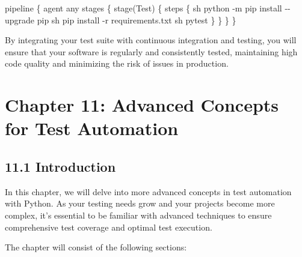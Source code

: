 \documentclass[
  paper=a4,
  ,captions=tableheading
]{scrartcl}
\newenvironment{Shaded}{}{}
\newcommand{\FunctionTok}[1]{\textcolor[rgb]{0.02,0.16,0.49}{#1}}
\newcommand{\NormalTok}[1]{#1}
\newcommand{\OperatorTok}[1]{\textcolor[rgb]{0.40,0.40,0.40}{#1}}
\newcommand{\StringTok}[1]{\textcolor[rgb]{0.25,0.44,0.63}{#1}}
\begin{document}
\begin{enumerate}
\begin{itemize}
\begin{Shaded}
\begin{Highlighting}[]
\NormalTok{pipeline }\OperatorTok{\{}
\NormalTok{    agent any}
\NormalTok{    stages }\OperatorTok{\{}
        \FunctionTok{stage}\OperatorTok{(}\StringTok{\textquotesingle{}Test\textquotesingle{}}\OperatorTok{)} \OperatorTok{\{}
\NormalTok{            steps }\OperatorTok{\{}
\NormalTok{                sh }\StringTok{\textquotesingle{}python {-}m pip install {-}{-}upgrade pip\textquotesingle{}}
\NormalTok{                sh }\StringTok{\textquotesingle{}pip install {-}r requirements.txt\textquotesingle{}}
\NormalTok{                sh }\StringTok{\textquotesingle{}pytest\textquotesingle{}}
            \OperatorTok{\}}
        \OperatorTok{\}}
    \OperatorTok{\}}
\OperatorTok{\}}
\end{Highlighting}
\end{Shaded}
  \end{itemize}
\end{enumerate}

By integrating your test suite with continuous integration and testing,
you will ensure that your software is regularly and consistently tested,
maintaining high code quality and minimizing the risk of issues in
production.

\hypertarget{chapter-11-advanced-concepts-for-test-automation}{%
\chapter{Chapter 11: Advanced Concepts for Test
Automation}\label{chapter-11-advanced-concepts-for-test-automation}}

\hypertarget{introduction}{%
\section{11.1 Introduction}\label{introduction}}

In this chapter, we will delve into more advanced concepts in test
automation with Python. As your testing needs grow and your projects
become more complex, it's essential to be familiar with advanced
techniques to ensure comprehensive test coverage and optimal test
execution.

The chapter will consist of the following sections:
\end{document}
